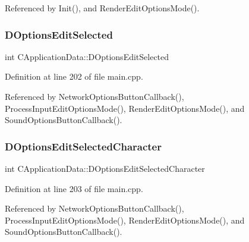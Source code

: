 Referenced by Init(), and Render\+Edit\+Options\+Mode().

\hypertarget{classCApplicationData_aee4aa5eb5b89b86eb2648d0f9c7358f9}{}\label{classCApplicationData_aee4aa5eb5b89b86eb2648d0f9c7358f9} 
\subsubsection{\texorpdfstring{D\+Options\+Edit\+Selected}{DOptionsEditSelected}}
{\footnotesize\ttfamily int C\+Application\+Data\+::\+D\+Options\+Edit\+Selected\hspace{0.3cm}{\ttfamily [protected]}}



Definition at line 202 of file main.\+cpp.



Referenced by Network\+Options\+Button\+Callback(), Process\+Input\+Edit\+Options\+Mode(), Render\+Edit\+Options\+Mode(), and Sound\+Options\+Button\+Callback().

\hypertarget{classCApplicationData_a921d69021fc61e51d12d8a26a5ac1a89}{}\label{classCApplicationData_a921d69021fc61e51d12d8a26a5ac1a89} 
\subsubsection{\texorpdfstring{D\+Options\+Edit\+Selected\+Character}{DOptionsEditSelectedCharacter}}
{\footnotesize\ttfamily int C\+Application\+Data\+::\+D\+Options\+Edit\+Selected\+Character\hspace{0.3cm}{\ttfamily [protected]}}



Definition at line 203 of file main.\+cpp.



Referenced by Network\+Options\+Button\+Callback(), Process\+Input\+Edit\+Options\+Mode(), Render\+Edit\+Options\+Mode(), and Sound\+Options\+Button\+Callback().

\hypertarget{classCApplicationData_a7044dc34cbd9d6776e8ef79eb12b5ce4}{}\label{classCApplicationData_a7044dc34cbd9d6776e8ef79eb12b5ce4} 
